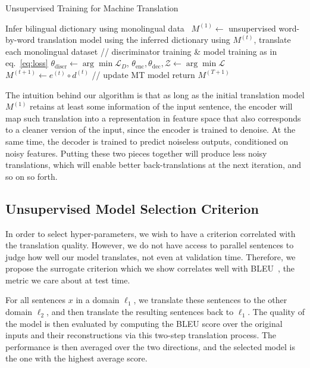 \begin{algorithm}[t] 
\caption{Unsupervised Training for Machine Translation}
\begin{algorithmic}[1]
\State Infer bilingual dictionary using monolingual data~\citep{wordalign17}
\State $M^{(1)} \gets $ unsupervised word-by-word translation model using the inferred dictionary
\State using $M^{(t)}$, translate each monolingual dataset 
\State // discriminator training \& model training as in eq.~\ref{eq:loss}
\State $\theta_\mathrm{discr} \gets  \arg \min  \mathcal{L}_{D}$, \hspace{.2cm} $\theta_\mathrm{enc},\theta_\mathrm{dec},\mathcal{Z} \gets \arg \min  \mathcal{L}$
\State $M^{(t+1)} \gets e^{(t)} \circ d^{(t)}$  // update MT model
\EndFor
\State return $M^{(T+1)}$
\EndProcedure
\end{algorithmic}
\label{algo:main_algo}
\end{algorithm}

The intuition behind our algorithm is that as long as the initial translation model $M^{(1)}$ retains at least some information of the input sentence, the encoder will map such translation into a representation in feature space that also corresponds to a cleaner version of the input, since the encoder is  trained to denoise. At the same time, the decoder is trained to predict noiseless outputs, conditioned on noisy features. Putting these two pieces together will produce less noisy translations, which will enable better back-translations at the next iteration, and so on so forth. 

\subsection{Unsupervised Model Selection Criterion}
\label{sec:unsupervised_criterion}

In order to select hyper-parameters, we wish to have a criterion correlated with the translation quality. However, we do not have access to parallel sentences to judge how well our model translates, not even at validation time. Therefore, we propose the surrogate criterion which we show correlates well with BLEU~\citep{bleu}, the metric we care about at test time.

For all sentences $x$ in a domain $\ell_1$, we translate these sentences to the other domain $\ell_2$, and then translate the resulting sentences back to $\ell_1$. The quality of the model is then evaluated by computing the BLEU score over the original inputs and their reconstructions via this two-step translation process. The performance is then averaged over the two directions, and the selected model is the one with the highest average score. 

